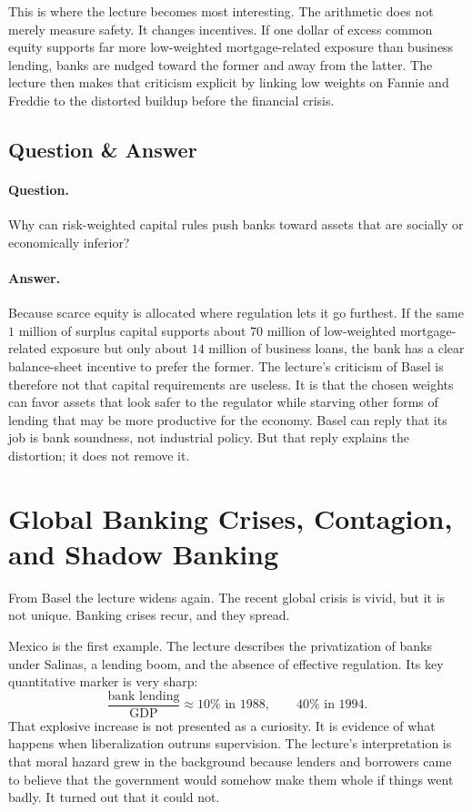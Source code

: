 This is where the lecture becomes most interesting. The arithmetic does not merely measure safety. It changes incentives. If one dollar of excess common equity supports far more low-weighted mortgage-related exposure than business lending, banks are nudged toward the former and away from the latter. The lecture then makes that criticism explicit by linking low weights on Fannie and Freddie to the distorted buildup before the financial crisis.

\subsection{Question \& Answer}

\paragraph{Question.} Why can risk-weighted capital rules push banks toward assets that are socially or economically inferior?

\paragraph{Answer.} Because scarce equity is allocated where regulation lets it go furthest. If the same \(1\) million of surplus capital supports about \(70\) million of low-weighted mortgage-related exposure but only about \(14\) million of business loans, the bank has a clear balance-sheet incentive to prefer the former. The lecture's criticism of Basel is therefore not that capital requirements are useless. It is that the chosen weights can favor assets that look safer to the regulator while starving other forms of lending that may be more productive for the economy. Basel can reply that its job is bank soundness, not industrial policy. But that reply explains the distortion; it does not remove it.

\section{Global Banking Crises, Contagion, and Shadow Banking}

From Basel the lecture widens again. The recent global crisis is vivid, but it is not unique. Banking crises recur, and they spread.

Mexico is the first example. The lecture describes the privatization of banks under Salinas, a lending boom, and the absence of effective regulation. Its key quantitative marker is very sharp:
\begin{equation}
\frac{\text{bank lending}}{\text{GDP}} \approx 10\% \text{ in 1988},\qquad
40\% \text{ in 1994}.
\end{equation}
That explosive increase is not presented as a curiosity. It is evidence of what happens when liberalization outruns supervision. The lecture's interpretation is that moral hazard grew in the background because lenders and borrowers came to believe that the government would somehow make them whole if things went badly. It turned out that it could not.

